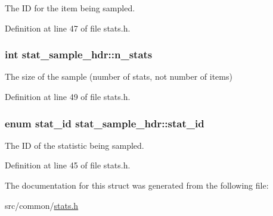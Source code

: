 The I\-D for the item being sampled. 



Definition at line 47 of file stats.\-h.

\hypertarget{structstat__sample__hdr_a597d2260ddea06ef785ead436adb277c}{
\subsubsection[{n\-\_\-stats}]{\setlength{\rightskip}{0pt plus 5cm}int stat\-\_\-sample\-\_\-hdr\-::n\-\_\-stats}}\label{structstat__sample__hdr_a597d2260ddea06ef785ead436adb277c}


The size of the sample (number of stats, not number of items) 



Definition at line 49 of file stats.\-h.

\hypertarget{structstat__sample__hdr_a742c0f6bbca05f6e9274202df2e6d6a2}{
\subsubsection[{stat\-\_\-id}]{\setlength{\rightskip}{0pt plus 5cm}enum {\bf stat\-\_\-id} stat\-\_\-sample\-\_\-hdr\-::stat\-\_\-id}}\label{structstat__sample__hdr_a742c0f6bbca05f6e9274202df2e6d6a2}


The I\-D of the statistic being sampled. 



Definition at line 45 of file stats.\-h.



The documentation for this struct was generated from the following file\-:\begin{DoxyCompactItemize}
\item 
src/common/\hyperlink{stats_8h}{stats.\-h}\end{DoxyCompactItemize}
